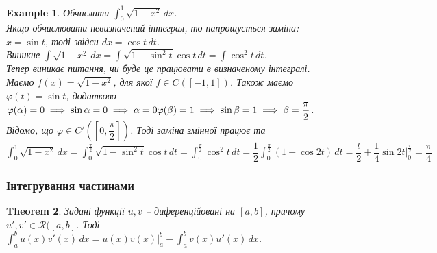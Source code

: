 \documentclass[a4paper, 10pt]{article}
\makeatletter
\def\huge{\displaystyle}
\def\qed{$\blacksquare$}
\theoremstyle{theoremdd}
\newtheorem{theorem}{Theorem}[subsection]
\theoremstyle{theoremdd}
\theoremstyle{theoremdd}
\theoremstyle{theoremdd}
\theoremstyle{theoremdd}
\newtheorem{example}[theorem]{Example}
\theoremstyle{theoremdd}
\theoremstyle{theoremdd}
\theoremstyle{theoremdd}
\theoremstyle{theoremdd}
\renewenvironment{proof}[1][Proof.\\]{\par
\pushQED{\hfill \qed}%
\normalfont \topsep6\p@\@plus6\p@\relax
\trivlist
\item\relax
{\bfseries
#1\@addpunct{.}}\hspace\labelsep\ignorespaces
}{%
\popQED\endtrivlist\@endpefalse
}
\makeatother
\begin{document}
\iffalse
\begin{proof}
Оскільки $f \in C((A,B))$, то також $f \in C(\varphi([\alpha,\beta]))$ (зауважу, що $\varphi([a,b])$ - це також відрізок), тоді $f$ неперервна на відрізку з кінцями $\varphi(\alpha),\varphi(\beta)$, а тому вона має первісну $G$. За формулою Ньютона-Лейбніца:\\
$\huge\int_{\varphi(\alpha)}^{\varphi(\beta)} f(x)\,dx = G(\varphi(\beta)) - G(\varphi(\alpha))$.\\
За умовою, маємо $f \circ \varphi \cdot \varphi' \in C([\alpha,\beta])$. А також зауважимо, що $G$ - первісна для функції $f \circ \varphi \cdot \varphi'$, тому що $G'(\varphi(x)) = f(\varphi(x)) \varphi'(x)$. За формулою Ньютона-Лейбніца:\\
$\huge\int_\alpha^\beta f(\varphi(x))\varphi'(x)\,dx = G(\varphi(b)) - G(\varphi(a))$.\\
Отже, $\huge\int_\alpha^\beta f(\varphi(x))\varphi'(x)\,dx = \int_{\varphi(\alpha)}^{\varphi(\beta)} f(x)\,dx$.
\end{proof}
\fi

\begin{example}
Обчислити $\huge\int_0^1 \sqrt{1-x^2}\,dx$.\\
Якщо обчислювати невизначений інтеграл, то напрошується заміна: \\
$x = \sin t$, тоді звідси $dx = \cos t \,dt$.\\
Виникне $\huge\int \sqrt{1-x^2}\,dx = \int \sqrt{1-\sin^2 t} \cos t\,dt = \int \cos^2 t\,dt$.\\
Тепер виникає питання, чи буде це працювати в визначеному інтегралі.\\
Маємо $f(x) = \sqrt{1-x^2}$, для якої $f \in C([-1,1])$. Також маємо $\varphi(t) = \sin t$, додатково \\
$\varphi(\alpha) = 0 \implies \sin \alpha = 0 \implies \alpha = 0 \\
\varphi(\beta) = 1 \implies \sin \beta = 1 \implies \beta = \dfrac{\pi}{2}$.\\ Відомо, що $\varphi \in C'\left(\left[0,\dfrac{\pi}{2}\right]\right)$. Тоді заміна змінної працює та\\
$\huge\int_0^1 \sqrt{1-x^2}\,dx = \int_0^{\frac{\pi}{2}} \sqrt{1-\sin^2 t} \cos t \,dt = \int_0^{\frac{\pi}{2}} \cos^2 t\,dt = \dfrac{1}{2} \int_0^{\frac{\pi}{2}} (1+\cos 2t)\,dt = \dfrac{t}{2} + \dfrac{1}{4} \sin 2t \Big|_0^{\frac{\pi}{2}} = \dfrac{\pi}{4}$
\end{example}

\subsubsection{Інтегрування частинами}
\begin{theorem}
Задані функції $u,v$ -- диференційовані на $[a,b]$, причому $u',v' \in \mathcal{R}([a,b]$. Тоді \\
$\huge\int_a^b u(x)v'(x)\,dx = u(x)v(x) \Big|_a^b - \int_a^b v(x)u'(x)\,dx$.
\end{theorem}
\end{document}
